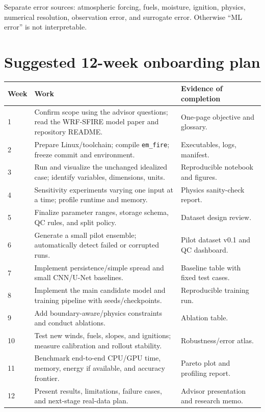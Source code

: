\documentclass[11pt]{article}
\begin{document}
Separate error sources: atmospheric forcing, fuels, moisture, ignition, physics, numerical resolution, observation error, and surrogate error. Otherwise ``ML error'' is not interpretable.

\section{Suggested 12-week onboarding plan}

\begin{longtable}{p{}p{}p{}}
\toprule
\textbf{Week} & \textbf{Work} & \textbf{Evidence of completion} \\
\midrule
1 & Confirm scope using the advisor questions; read the WRF-SFIRE model paper and repository README. & One-page objective and glossary. \\
2 & Prepare Linux/toolchain; compile \texttt{em\_fire}; freeze commit and environment. & Executables, logs, manifest. \\
3 & Run and visualize the unchanged idealized case; identify variables, dimensions, units. & Reproducible notebook and figures. \\
4 & Sensitivity experiments varying one input at a time; profile runtime and memory. & Physics sanity-check report. \\
5 & Finalize parameter ranges, storage schema, QC rules, and split policy. & Dataset design review. \\
6 & Generate a small pilot ensemble; automatically detect failed or corrupted runs. & Pilot dataset v0.1 and QC dashboard. \\
7 & Implement persistence/simple spread and small CNN/U-Net baselines. & Baseline table with fixed test cases. \\
8 & Implement the main candidate model and training pipeline with seeds/checkpoints. & Reproducible training run. \\
9 & Add boundary-aware/physics constraints and conduct ablations. & Ablation table. \\
10 & Test new winds, fuels, slopes, and ignitions; measure calibration and rollout stability. & Robustness/error atlas. \\
11 & Benchmark end-to-end CPU/GPU time, memory, energy if available, and accuracy frontier. & Pareto plot and profiling report. \\
12 & Present results, limitations, failure cases, and next-stage real-data plan. & Advisor presentation and research memo. \\
\bottomrule
\end{longtable}
\end{document}
